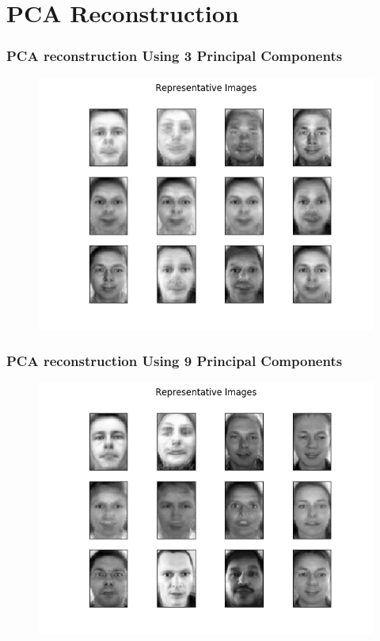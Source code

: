 \documentclass[11pt]{beamer}
\begin{document}
\section{PCA Reconstruction}
\begin{frame}
\frametitle{PCA reconstruction Using 3 Principal Components}
\begin{figure}
\includegraphics[width=.95\textwidth]{Representative_Images_U_3.png}
\end{figure}
\end{frame}

\begin{frame}
\frametitle{PCA reconstruction Using 9 Principal Components}
\begin{figure}
\includegraphics[width=.95\textwidth]{Representative_Images_U_9.png}
\end{figure}
\end{frame}
\end{document}
